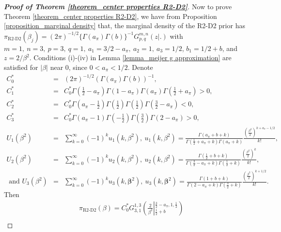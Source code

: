 \documentclass[12pt]{article}
\begin{document}
\begin{proof} [\textbf{Proof of Theorem \ref{theorem_center properties R2-D2}}]
	Now to prove Theorem \ref{theorem_center properties R2-D2}, we have from Proposition \ref{proposition_marginal density} that,
	the marginal density of  the R2-D2  prior has $\pi_{\text{R2-D2}}(\beta_j) =   (2\pi)^{-1/2}\{ \Gamma(a_\pi)\Gamma(b) \}^{-1}G^{m,n}_{p,q} \left(z  | . \right)$ with $m=1, \ n=3,\ p=3,\ q=1,\ a_1=3/2-a_\pi,\ a_2=1, \ a_3=1/2$,    $b_1 =1/2+b$, and $z=2/{\beta^2}$.
	Conditions (i)-(iv)  in   Lemma  \ref{lemma_meijer g approximation} are  satisfied
	for $|\beta|$ near 0, since $0<a_\pi<1/2$.
	Denote
	{  \begin{eqnarray*}
			C_0^\ast &=& { (2\pi)^{-1/2}(\Gamma(a_\pi)\Gamma(b))^{-1} },  \\
			C_1^\ast &=&C_0^\ast \Gamma(\frac{1}{2}-a_\pi)\Gamma(1-a_\pi)\Gamma(a_\pi) \Gamma(\frac{1}{2}+a_\pi)  >0 , \\
			C_2^\ast &=&C_0^\ast \Gamma(a_\pi-\frac{1}{2}) \Gamma(\frac{1}{2})\Gamma(\frac{1}{2}) \Gamma(\frac{3}{2}-a_\pi) <0  , \\
			C_3^\ast &=&C_0^\ast \Gamma(a_\pi-1)\Gamma(-\frac{1}{2})\Gamma(\frac{3}{2})\Gamma(2-a_\pi) > 0 , \\
			U_1(\beta^2) &=&
			\sum\limits_{k=0}^{\infty}(-1)^k  u_1(k, \beta^2),  \ 		u_1(k, \beta^2) = \frac{\Gamma(a_\pi+b+k) }{\Gamma(\frac{1}{2}+a_\pi+k)\Gamma(a_\pi+k) } \frac{ (\frac{\beta^2}{2})^{k+a_\pi-1/2}} {k!}  , \\
			U_2(\beta^2) &=&  	\sum\limits_{k=0}^{\infty} (-1)^k u_2(k, \beta^2),    \
			u_2(k, \beta^2)= 	\frac{\Gamma(\frac{1}{2}+b+k) }{\Gamma(\frac{3}{2}-a_\pi+k)\Gamma(\frac{1}{2}+k)} \frac{(\frac{\beta^2}{2})^k}{k!} ,  \\
			\text{ and }
			U_3(\beta^2) &=& 	\sum\limits_{k=0}^{\infty} (-1)^ku_3(k,\bm\beta^2), \  u_3(k,\bm\beta^2) = \frac{\Gamma(1+b+k)}{\Gamma(2-a_\pi+k)\Gamma(\frac{3}{2}+k)}
			\frac{(\frac{\beta^2}{2})^{k+1/2}}{k!}  .
	\end{eqnarray*}}
	Then
	{ \begin{eqnarray*}
			&&\pi_{\text{R2-D2}} (\beta) =C_0^\ast    G^{1,3}_{3,1}\left( \frac{2}{\beta^2} \left\vert_{ \frac{1}{2}+b }^{\frac{3}{2} -  a_\pi,1,\frac{1}{2}}\right.
			\right) \\

\end{eqnarray*}}
\end{proof}
\end{document}
